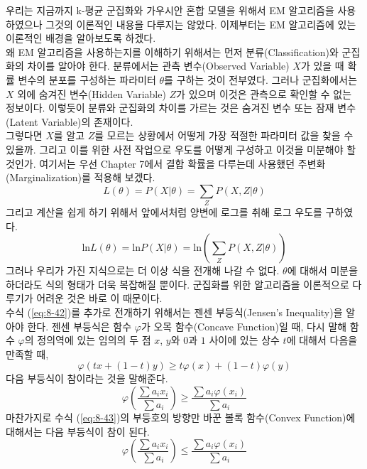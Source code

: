 \documentclass[a4paper]{oblivoir}
\begin{document}
우리는 지금까지 k-평균 군집화와 가우시안 혼합 모델을 위해서 EM 알고리즘을 사용하였으나 그것의 이론적인 내용을 다루지는 않았다. 이제부터는 EM 알고리즘에 있는 이론적인 배경을 알아보도록 하겠다. \\

왜 EM 알고리즘을 사용하는지를 이해하기 위해서는 먼저 분류(Classification)와 군집화의 차이를 알아야 한다. 분류에서는 관측 변수(Observed Variable) $X$가 있을 때 확률 변수의 분포를 구성하는 파라미터 $\theta$를 구하는 것이 전부였다. 그러나 군집화에서는 $X$ 외에 숨겨진 변수(Hidden Variable) $Z$가 있으며 이것은 관측으로 확인할 수 없는 정보이다. 이렇듯이 분류와 군집화의 차이를 가르는 것은 숨겨진 변수 또는 잠재 변수(Latent Variable)의 존재이다. \\

그렇다면 $X$를 알고 $Z$를 모르는 상황에서 어떻게 가장 적절한 파라미터 값을 찾을 수 있을까. 그리고 이를 위한 사전 작업으로 우도를 어떻게 구성하고 이것을 미분해야 할 것인가. 여기서는 우선 Chapter 7에서 결합 확률을 다루는데 사용했던 주변화(Marginalization)를 적용해 보겠다. 
\begin{equation}
L(\theta) = P(X|\theta) = \sum_{Z} P(X, Z|\theta) \label{eq:8-41}
\end{equation}
그리고 계산을 쉽게 하기 위해서 앞에서처럼 양변에 로그를 취해 로그 우도를 구하였다.
\begin{equation}
\textrm{ln} L(\theta) = \textrm{ln} P(X|\theta) = \textrm{ln} (\sum_{Z} P(X, Z|\theta)) \label{eq:8-42}
\end{equation}
그러나 우리가 가진 지식으로는 더 이상 식을 전개해 나갈 수 없다. $\theta$에 대해서 미분을 하더라도 식의 형태가 더욱 복잡해질 뿐이다. 군집화를 위한 알고리즘을 이론적으로 다루기가 어려운 것은 바로 이 때문이다. \\

수식 (\ref{eq:8-42})를 추가로 전개하기 위해서는 젠센 부등식(Jensen's Inequality)을 알아야 한다. 젠센 부등식은 함수 $\varphi$가 오목 함수(Concave Function)일 때, 다시 말해 함수 $\varphi$의 정의역에 있는 임의의 두 점 $x$, $y$와 $0$과 $1$ 사이에 있는 상수 $t$에 대해서 다음을 만족할 때,
\begin{equation}
\varphi(tx+(1-t)y) \geq t\varphi(x) + (1-t)\varphi(y) \label{eq:8-43}
\end{equation}
다음 부등식이 참이라는 것을 말해준다.
\begin{equation}
\varphi(\frac{\sum a_{i}x_{i}}{\sum a_{i}}) \geq \frac{\sum a_{i}\varphi(x_{i})}{\sum a_{i}}  \label{eq:8-44}
\end{equation}
마찬가지로 수식 (\ref{eq:8-43})의 부등호의 방향만 바꾼 볼록 함수(Convex Function)에 대해서는 다음 부등식이 참이 된다.  
\begin{equation}
\varphi(\frac{\sum a_{i}x_{i}}{\sum a_{i}}) \leq \frac{\sum a_{i}\varphi(x_{i})}{\sum a_{i}}  \label{eq:8-45}
\end{equation} \\
\end{document}
